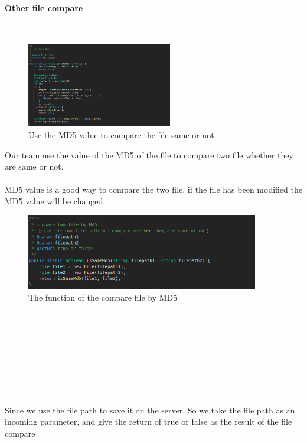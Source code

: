 \documentclass[12pt,a4]{article}
\begin{document}
\paragraph{Other file compare}~{}
\newline
\begin{figure}[h]%
		\centering  %
		\includegraphics[width=2.5in]{figure/4231}  	%
		\caption{Use the MD5 value to compare the file same or not}   %
		\end{figure}
Our team use the value of the MD5 of the file to compare two file whether they are same or not.\\\\
MD5 value is a good way to compare the two file, if the file has been modified the MD5 value will be changed.
\begin{figure}[h]%
		\centering  %
		\includegraphics[width=4in]{figure/4232}  	%
		\caption{The function of the compare file by MD5}   %
		\end{figure}
\\\\\\\\\\\\\\\\
Since we use the file path to save it on the server. So we take the file path as an incoming parameter, and give the return of true or false as the result of the file compare
\end{document}
